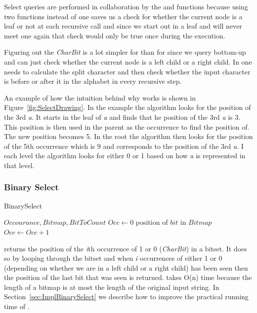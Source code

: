 Select queries are performed in collaboration by the  and  functions because using two functions instead of one saves us a check for whether the current node is a leaf or not at each recursive call and since we start out in a leaf and will never meet one again that check would only be true once during the execution.

Figuring out the \textit{CharBit} is a lot simpler for  than for  since we query bottom-up and can just check whether the current node is a left child or a right child. 
In  one needs to calculate the split character and then check whether the input character is before or after it in the alphabet in every recursive step.

An example of how the intuition behind why  works is shown in Figure~\ref{fig:SelectDrawing}.
In the example the algorithm looks for the position of the 3rd \textit{a}.
It starts in the leaf of \textit{a} and finds that he position of the 3rd \textit{a} is 3. 
This position is then used in the parent as the occurrence to find the position of. 
The new position becomes 5.
In the root the algorithm then looks for the position of the 5th occurrence which is 9 and corresponds to the position of the 3rd \textit{a}.
I each level the algorithm looks for either 0 or 1 based on how \textit{a} is represented in that level.

\subsubsection{Binary Select}
\label{sec:binarySelectDescription}
\begin{algorithm}
\caption{BinarySelect}
\label{alg:binaryselect}
\begin{algorithmic}
 {$Occourance, Bitmap, BitToCount$}
\State $Occ \gets 0$
		\State \Return position of $bit$ in $Bitmap$
	\EndIf
	\State $Occ \gets Occ + 1$
	\EndIf
\EndFor
\EndFunction
\end{algorithmic}
\end{algorithm}

 returns the position of the \textit{i}th occurrence of 1 or 0 (\textit{CharBit}) in a bitset. 
It does so by looping through the bitset and when \textit{i} occurrences of either 1 or 0 (depending on whether we are in a left child or a right child) has been seen then the position of the last bit that was seen is returned.
 takes O(n) time because the length of a bitmap is at most the length of the original input string.
In Section~\ref{sec:ImplBinarySelect} we describe how to improve the practical running time of .

